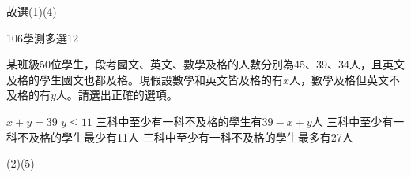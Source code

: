 \begin{QUESTIONS}
\begin{QUESTION}
\begin{QSOLLIST}
\begin{QSOL}[SOLID=33]
                故選(1)(4)
            \end{QSOL}

        \end{QSOLLIST}
        \begin{QEMPTYSPACE}
        \end{QEMPTYSPACE}
    \end{QUESTION}
    \begin{QUESTION}
        \begin{ExamInfo}{106}{學測}{多選}{12}
        \end{ExamInfo}
        \begin{ExamAnsRateInfo}{28}{37}{27}{20}
        \end{ExamAnsRateInfo}
        \begin{QBODY}
            某班級50位學生，段考國文、英文、數學及格的人數分別為45、39、34人，且英文及格的學生國文也都及格。現假設數學和英文皆及格的有$x$人，數學及格但英文不及格的有$y$人。請選出正確的選項。
			\begin{QOPS}
				\QOP $x+y=39$
				\QOP $y\le 11$
				\QOP 三科中至少有一科不及格的學生有$39-x+y$人
				\QOP 三科中至少有一科不及格的學生最少有11人
				\QOP 三科中至少有一科不及格的學生最多有27人
			\end{QOPS}
        \end{QBODY}
        \begin{QFROMS}
        \end{QFROMS}
        \begin{QTAGS}\end{QTAGS}
        \begin{QANS}
            (2)(5)
        \end{QANS}
        \begin{QSOLLIST}
            \begin{QSOL}[SOLID=34]
				\begin{QSTEPS}
\end{QSTEPS}
\end{QSOL}
\end{QSOLLIST}
\end{QUESTION}
\end{QUESTIONS}
